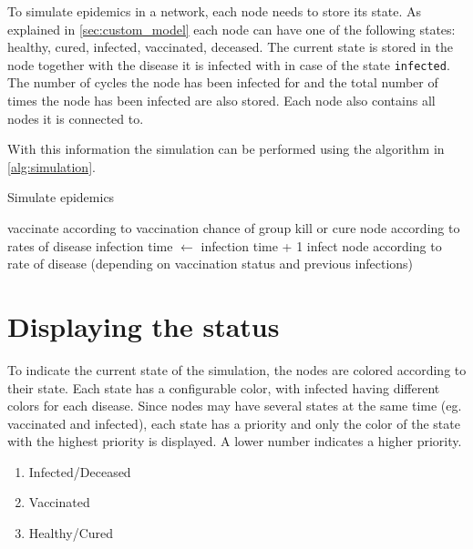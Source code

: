 To simulate epidemics in a network, each node needs to store its state. As explained in \ref{sec:custom_model}
each node can have one of the following states: healthy, cured, infected, vaccinated, deceased. The current state is stored in the node together with the disease it is infected with in case of the state \texttt{infected}. The number of cycles the node has been infected for and the total number of times the node has been infected are also stored. Each node also contains all nodes it is connected to.

With this information the simulation can be performed using the algorithm in \ref{alg:simulation}.

\begin{algorithm}
\caption{Simulate epidemics}
\label{alg:simulation}
\begin{algorithmic}
        \State vaccinate according to vaccination chance of group
    \EndIf
            \State kill or cure node according to rates of disease
        \Else
            \State infection time $\gets$ infection time + 1
                \State infect node according to rate of disease 
                \State (depending on vaccination status and previous infections)
            \EndFor
        \EndIf
    \EndIf
\EndFor
\end{algorithmic}
\end{algorithm}

\section{Displaying the status}
\label{sec:color_sequence}
To indicate the current state of the simulation, the nodes are colored according to their state. Each state has a configurable color, with infected having different colors for each disease. Since nodes may have several states at the same time (eg. vaccinated and infected), each state has a priority and only the color of the state with the highest priority is displayed. A lower number indicates a higher priority.
\begin{enumerate}
    \item Infected/Deceased
    \item Vaccinated
    \item Healthy/Cured
\end{enumerate}

